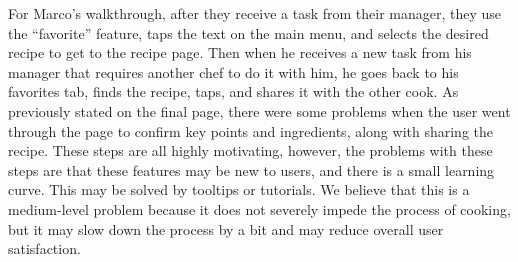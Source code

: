 \documentclass[11pt,english]{article}
\begin{document}
For Marco’s walkthrough, after they receive a task from their manager, they use the “favorite” feature, taps the text on the main menu, and selects the desired recipe to get to the recipe page. Then when he receives a new task from his manager that requires another chef to do it with him, he goes back to his favorites tab, finds the recipe, taps, and shares it with the other cook. As previously stated on the final page, there were some problems when the user went through the page to confirm key points and ingredients, along with sharing the recipe. These steps are all highly motivating, however, the problems with these steps are that these features may be new to users, and there is a small learning curve. This may be solved by tooltips or tutorials. We believe that this is a medium-level problem because it does not severely impede the process of cooking, but it may slow down the process by a bit and may reduce overall user satisfaction.
\end{document}

